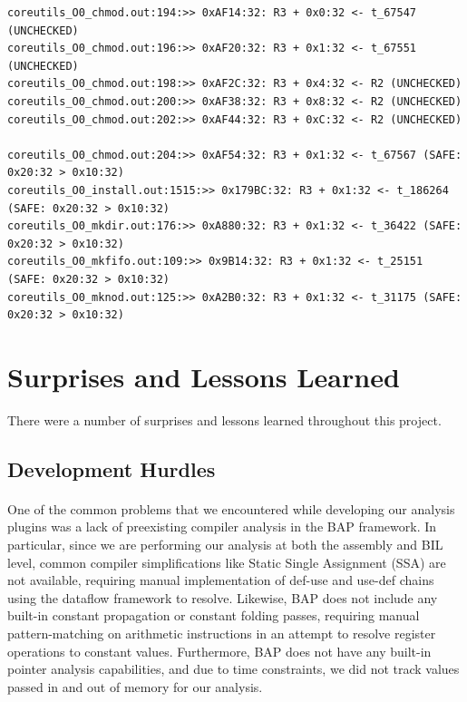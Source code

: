 \documentclass[letterpaper,11pt]{article}
\begin{document}
\tiny
\begin{verbatim}
coreutils_O0_chmod.out:194:>> 0xAF14:32: R3 + 0x0:32 <- t_67547 (UNCHECKED)
coreutils_O0_chmod.out:196:>> 0xAF20:32: R3 + 0x1:32 <- t_67551 (UNCHECKED)
coreutils_O0_chmod.out:198:>> 0xAF2C:32: R3 + 0x4:32 <- R2 (UNCHECKED)
coreutils_O0_chmod.out:200:>> 0xAF38:32: R3 + 0x8:32 <- R2 (UNCHECKED)
coreutils_O0_chmod.out:202:>> 0xAF44:32: R3 + 0xC:32 <- R2 (UNCHECKED)

coreutils_O0_chmod.out:204:>> 0xAF54:32: R3 + 0x1:32 <- t_67567 (SAFE: 0x20:32 > 0x10:32)
coreutils_O0_install.out:1515:>> 0x179BC:32: R3 + 0x1:32 <- t_186264 (SAFE: 0x20:32 > 0x10:32)
coreutils_O0_mkdir.out:176:>> 0xA880:32: R3 + 0x1:32 <- t_36422 (SAFE: 0x20:32 > 0x10:32)
coreutils_O0_mkfifo.out:109:>> 0x9B14:32: R3 + 0x1:32 <- t_25151 (SAFE: 0x20:32 > 0x10:32)
coreutils_O0_mknod.out:125:>> 0xA2B0:32: R3 + 0x1:32 <- t_31175 (SAFE: 0x20:32 > 0x10:32)
\end{verbatim}
\normalsize

\section{Surprises and Lessons Learned}
\label{lessonslearned}

There were a number of surprises and lessons learned throughout this project.

\subsection{Development Hurdles}

\paragraph{}
One of the common problems that we encountered while developing our analysis
plugins was a lack of preexisting compiler analysis in the BAP framework. In
particular, since we are performing our analysis at both the assembly and BIL
level, common compiler simplifications like Static Single Assignment (SSA) are
not available, requiring manual implementation of def-use and use-def chains
using the dataflow framework to resolve. Likewise, BAP does not include any
built-in constant propagation or constant folding passes, requiring manual
pattern-matching on arithmetic instructions in an attempt to resolve register
operations to constant values. Furthermore, BAP does not have any built-in
pointer analysis capabilities, and due to time constraints, we did not track
values passed in and out of memory for our analysis.
\end{document}
